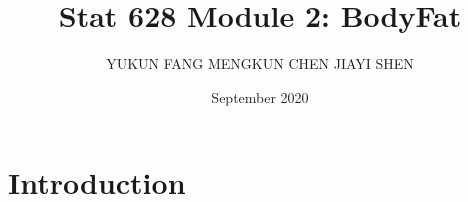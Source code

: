 \documentclass[12pt]{article}
\title{\vspace{-3em}Stat 628 Module 2: BodyFat}
\author{YUKUN FANG \quad MENGKUN CHEN \quad JIAYI SHEN}
\date{September 2020}
\begin{document}
\sffamily
\maketitle
\section{\sffamily Introduction}
\end{document}
